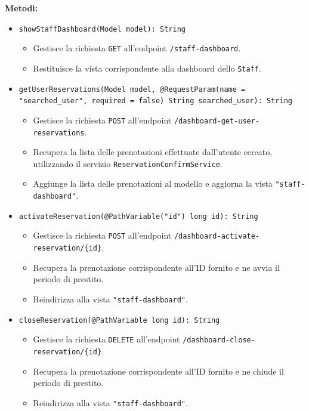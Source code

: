\documentclass[twoside,openright,titlepage,fleqn,headinclude,12pt,a4paper,BCOR=5mm,footinclude]{scrbook}
\begin{document}
\textbf{Metodi:}  
\begin{itemize}  
   
    \item \texttt{showStaffDashboard(Model model): String}  
    \begin{itemize}  
        \item Gestisce la richiesta \texttt{GET} all'endpoint \texttt{/staff-dashboard}.  
        \item Restituisce la vista corrispondente alla dashboard dello \texttt{Staff}.  
    \end{itemize}  

    \item \texttt{getUserReservations(Model model, @RequestParam(name = "searched\_user", required = false) String searched\_user): String}  
    \begin{itemize}  
        \item Gestisce la richiesta \texttt{POST} all’endpoint \texttt{/dashboard-get-user-reservations}.  
        \item Recupera la lista delle prenotazioni effettuate dall'utente cercato, utilizzando il servizio \texttt{ReservationConfirmService}.  
        \item Aggiunge la lista delle prenotazioni al modello e aggiorna la vista \texttt{"staff-dashboard"}.  
    \end{itemize}  

    \item \texttt{activateReservation(@PathVariable("id") long id): String}  
    \begin{itemize}  
        \item Gestisce la richiesta \texttt{POST} all’endpoint \texttt{/dashboard-activate-reservation/\{id\}}.  
        \item Recupera la prenotazione corrispondente all'ID fornito e ne avvia il periodo di prestito.  
        \item Reindirizza alla vista \texttt{"staff-dashboard"}.  
    \end{itemize}  

    \item \texttt{closeReservation(@PathVariable long id): String}  
    \begin{itemize}  
        \item Gestisce la richiesta \texttt{DELETE} all’endpoint \texttt{/dashboard-close-reservation/\{id\}}.  
        \item Recupera la prenotazione corrispondente all'ID fornito e ne chiude il periodo di prestito.  
        \item Reindirizza alla vista \texttt{"staff-dashboard"}.  
    \end{itemize}  
\end{itemize}  
\end{document}
